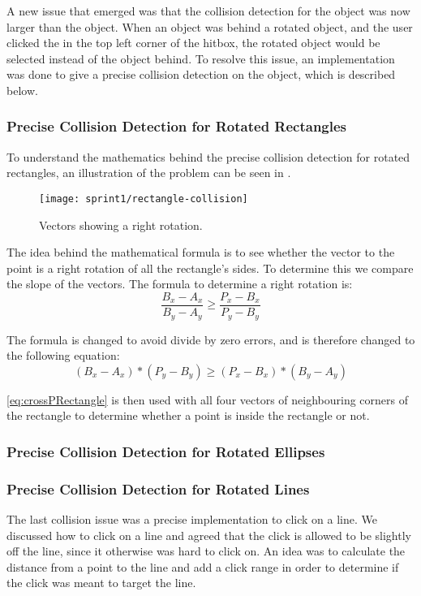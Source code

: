 A new issue that emerged was that the collision detection for the object was now larger than the object.
When an object was behind a rotated object, and the user clicked the in the top left corner of the hitbox, the rotated object would be selected instead of the object behind.
To resolve this issue, an implementation was done to give a precise collision detection on the object, which is described below.

\subsubsection{Precise Collision Detection for Rotated Rectangles}
To understand the mathematics behind the precise collision detection for rotated rectangles, an illustration of the problem can be seen in .

\begin{figure}[h]
	\centering
	\texttt{[image: sprint1/rectangle-collision]}
	\caption{Vectors showing a right rotation.}
	\label{figure:rectangle-collision}
\end{figure}

The idea behind the mathematical formula is to see whether the vector to the point is a right rotation of all the rectangle's sides.
To determine this we compare the slope of the vectors.
The formula to determine a right rotation is:
\begin{equation}
	\frac{B_x-A_x}{B_y-A_y} \geq \frac{P_x-B_x}{P_y-B_y}
\end{equation}

The formula is changed to avoid divide by zero errors, and is therefore changed to the following equation:
\begin{equation}\label{eq:crossPRectangle}
	(B_x-A_x)*(P_y-B_y) \geq (P_x-B_x)*(B_y-A_y)
\end{equation} 

\eqref{eq:crossPRectangle} is then used with all four vectors of neighbouring corners of the rectangle to determine whether a point is inside the rectangle or not.

\subsubsection{Precise Collision Detection for Rotated Ellipses}



\subsubsection{Precise Collision Detection for Rotated Lines}
The last collision issue was a precise implementation to click on a line.
We discussed how to click on a line and agreed that the click is allowed to be slightly off the line, since it otherwise was hard to click on.
An idea was to calculate the distance from a point to the line and add a click range in order to determine if the click was meant to target the line.

